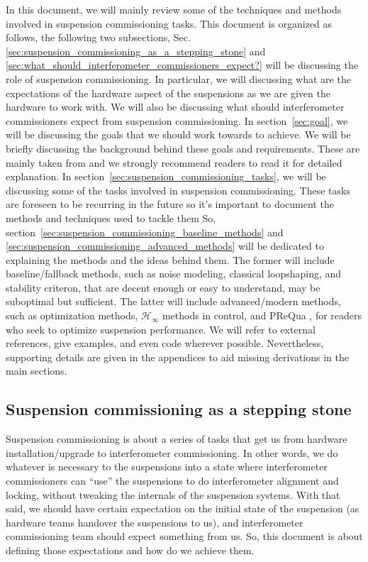 In this document, we will mainly review some of the techniques and methods involved in suspension commissioning tasks.
This document is organized as follows, the following two subsections, Sec.\ref{sec:suspension_commissioning_as_a_stepping_stone} and \ref{sec:what_should_interferometer_commissioners_expect?} will be discussing the role of suspension commissioning.
In particular, we will discussing what are the expectations of the hardware aspect of the suspensions as we are given the hardware to work with.
We will also be discussing what should interferometer commissioners expect from suspension commissioning.
In section~\ref{sec:goal}, we will be discussing the goals that we should work towards to achieve. We will be briefly discussing the background behind these goals and requirements.
These are mainly taken from \cite{Sekiguchi:2016bmv} and we strongly recommend readers to read it for detailed explanation.
In section~\ref{sec:suspension_commissioning_tasks}, we will be discussing some of the tasks involved in suspension commissioning.
These tasks are foreseen to be recurring in the future so it's important to document the methods and techniques used to tackle them
So, section~\ref{sec:suspension_commissioning_baseline_methods} and \ref{sec:suspension_commissioning_advanced_methods} will be dedicated to explaining the methods and the ideas behind them.
The former will include baseline/fallback methods, such as noise modeling, classical loopshaping, and stability criteron, that are decent enough or easy to understand, may be suboptimal but sufficient.
The latter will include advanced/modern methods, such as optimization methods, $\mathcal{H}_\infty$ methods in control,  and PReQua \cite{prequa}, for readers who seek to optimize suspension performance.
We will refer to external references, give examples, and even code wherever possible.
Nevertheless, supporting details are given in the appendices to aid missing derivations in the main sections.


\subsection{Suspension commissioning as a stepping stone \label{sec:suspension_commissioning_as_a_stepping_stone}}
Suspension commissioning is about a series of tasks that get us from hardware installation/upgrade to interferometer commissioning.
In other words, we do whatever is necessary to the suspensions into a state where interferometer commissioners can ``use'' the suspensions to do interferometer alignment and locking, without tweaking the internals of the suspension systems.
With that said, we should have certain expectation on the initial state of the suspension (as hardware teams handover the suspensions to us), and interferometer commissioning team should expect something from us.
So, this document is about defining those expectations and how do we achieve them.

